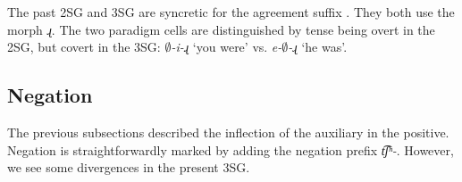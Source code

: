 The past 2SG and 3SG are syncretic for the agreement suffix \citep{KarakasDolatainGuekguezian-prep-DisentanglingTesnseAgreementWesternArmenian}. They both use the morph \textit{{ɻ}}. The two paradigm cells are distinguished by tense being overt in the 2SG, but covert in the 3SG: \textit{{$\emptyset$-i-ɻ}} `you were' vs. \textit{{e-$\emptyset$-ɻ}} `he was'. 


%
%	


\subsection{Negation}\label{section:verb:aux:neg}\largerpage
The previous subsections described the inflection of the auxiliary in the positive. Negation is straightforwardly marked by adding the negation prefix \textit{{t͡ʃʰ-}}. However, we see some divergences in the present 3SG.

%	

